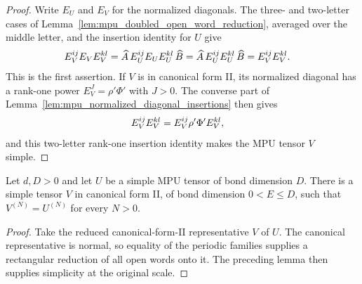 \begin{proof}\leanok
    Write $E_U$ and $E_V$ for the normalized diagonals. The three- and
    two-letter cases of Lemma~\ref{lem:mpu_doubled_open_word_reduction},
    averaged over the middle letter, and the insertion identity for $U$
    give
    \begin{align}
        E_V^{ij}E_VE_V^{kl}
         & =\widehat A\,E_U^{ij}E_UE_U^{kl}\,\widehat B
        =\widehat A\,E_U^{ij}E_U^{kl}\,\widehat B
        =E_V^{ij}E_V^{kl}.
        \notag
    \end{align}
    This is the first assertion. If $V$ is in canonical form II, its
    normalized diagonal has a rank-one power $E_V^J=\rho'\Phi'$ with
    $J>0$. The converse part of
    Lemma~\ref{lem:mpu_normalized_diagonal_insertions} then gives
    \begin{align}
        E_V^{ij}E_V^{kl} & =E_V^{ij}\rho'\Phi'E_V^{kl},
        \notag
    \end{align}
    and this two-letter rank-one insertion identity makes the MPU tensor
    $V$ simple.
\end{proof}

\begin{lemma}
    \label{lem:mpu_simple_reduced_canonical_representative}
    \leanok
    Let $d,D>0$ and let $U$ be a simple MPU tensor of bond dimension $D$.
    There is a simple tensor $V$ in canonical form II, of bond dimension
    $0<E\leq D$, such that $V^{(N)}=U^{(N)}$ for every $N>0$.
\end{lemma}

\begin{proof}\leanok
    Take the reduced canonical-form-II representative $V$ of $U$. The
    canonical representative is normal, so equality of the periodic
    families supplies a rectangular reduction of all open words onto it.
    The preceding lemma then supplies simplicity at the original scale.
\end{proof}

